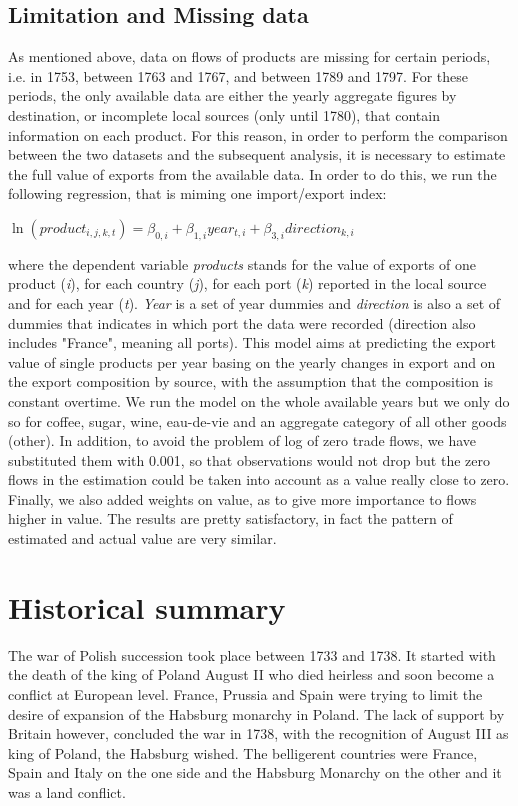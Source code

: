 \documentclass[12pt,a4paper,notitlepage,english]{article}
\begin{document}
\subsection{Limitation and Missing data} \label{limitations}
As mentioned above, data on flows of products are missing for certain periods, i.e. in 1753, between 1763 and 1767, and between 1789 and 1797. 
For these periods, the only available data are either the yearly aggregate figures by destination, or incomplete local sources (only until 1780), that contain information on each product. For this reason, in order to perform the comparison between the two datasets and the subsequent analysis, it is necessary to estimate the full value of exports from the available data. In order to do this, we run the following regression, that is miming one import/export index:
\begin{center}
$\ln(product_{i,j,k,t})=\beta_{0,i} + \beta_{1,i}year_{t,i}+\beta_{3,i}direction_{k,i}$
\end{center}
where the dependent variable \textit{products} stands for the value of exports of one product (\textit{i}), for each country (\textit{j}), for each port (\textit{k}) reported in the local source and for each year (\textit{t}). \textit{Year} is a set of year dummies and \textit{direction} is also a set of dummies that indicates in which port the data were recorded (direction also includes "France", meaning all ports). This model aims at predicting the export value of single products per year basing on the yearly changes in export and on the export composition by source, with the assumption that the composition is constant overtime. We run the model on the whole available years but we only do so for coffee, sugar, wine, eau-de-vie and an aggregate category of all other goods (other). In addition, to avoid the problem of log of zero trade flows, we have substituted them with 0.001, so that observations would not drop but the zero flows in the estimation could be taken into account as a value really close to zero. Finally, we also added weights on value, as to give more importance to flows higher in value. The results are pretty satisfactory, in fact the pattern of estimated and actual value are very similar. 

\section{Historical summary} \label{historical_summary}
The war of Polish succession took place between 1733 and 1738. It started with the death of the king of Poland August II who died heirless and soon become a conflict at European level. France, Prussia and Spain were trying to limit the desire of expansion of the Habsburg monarchy in Poland. The lack of support by Britain however, concluded the war in 1738, with the recognition of August III as king of Poland, the Habsburg wished. The belligerent countries were France, Spain and Italy on the one side and the Habsburg Monarchy on the other and it was a land conflict. 
\end{document}
